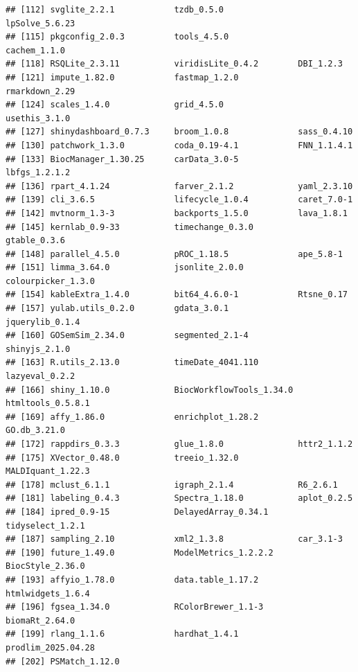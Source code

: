 \documentclass[9pt,a4paper,]{extarticle}
\begin{document}
\begin{verbatim}
## [112] svglite_2.2.1            tzdb_0.5.0               lpSolve_5.6.23          
## [115] pkgconfig_2.0.3          tools_4.5.0              cachem_1.1.0            
## [118] RSQLite_2.3.11           viridisLite_0.4.2        DBI_1.2.3               
## [121] impute_1.82.0            fastmap_1.2.0            rmarkdown_2.29          
## [124] scales_1.4.0             grid_4.5.0               usethis_3.1.0           
## [127] shinydashboard_0.7.3     broom_1.0.8              sass_0.4.10             
## [130] patchwork_1.3.0          coda_0.19-4.1            FNN_1.1.4.1             
## [133] BiocManager_1.30.25      carData_3.0-5            lbfgs_1.2.1.2           
## [136] rpart_4.1.24             farver_2.1.2             yaml_2.3.10             
## [139] cli_3.6.5                lifecycle_1.0.4          caret_7.0-1             
## [142] mvtnorm_1.3-3            backports_1.5.0          lava_1.8.1              
## [145] kernlab_0.9-33           timechange_0.3.0         gtable_0.3.6            
## [148] parallel_4.5.0           pROC_1.18.5              ape_5.8-1               
## [151] limma_3.64.0             jsonlite_2.0.0           colourpicker_1.3.0      
## [154] kableExtra_1.4.0         bit64_4.6.0-1            Rtsne_0.17              
## [157] yulab.utils_0.2.0        gdata_3.0.1              jquerylib_0.1.4         
## [160] GOSemSim_2.34.0          segmented_2.1-4          shinyjs_2.1.0           
## [163] R.utils_2.13.0           timeDate_4041.110        lazyeval_0.2.2          
## [166] shiny_1.10.0             BiocWorkflowTools_1.34.0 htmltools_0.5.8.1       
## [169] affy_1.86.0              enrichplot_1.28.2        GO.db_3.21.0            
## [172] rappdirs_0.3.3           glue_1.8.0               httr2_1.1.2             
## [175] XVector_0.48.0           treeio_1.32.0            MALDIquant_1.22.3       
## [178] mclust_6.1.1             igraph_2.1.4             R6_2.6.1                
## [181] labeling_0.4.3           Spectra_1.18.0           aplot_0.2.5             
## [184] ipred_0.9-15             DelayedArray_0.34.1      tidyselect_1.2.1        
## [187] sampling_2.10            xml2_1.3.8               car_3.1-3               
## [190] future_1.49.0            ModelMetrics_1.2.2.2     BiocStyle_2.36.0        
## [193] affyio_1.78.0            data.table_1.17.2        htmlwidgets_1.6.4       
## [196] fgsea_1.34.0             RColorBrewer_1.1-3       biomaRt_2.64.0          
## [199] rlang_1.1.6              hardhat_1.4.1            prodlim_2025.04.28      
## [202] PSMatch_1.12.0
\end{verbatim}
\end{document}

